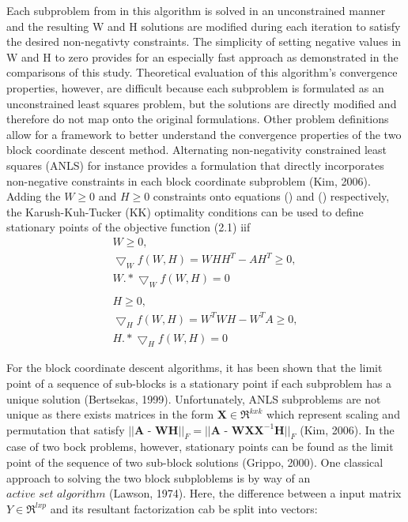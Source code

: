 \documentclass[final,leqno,onefignum,onetabnum]{siamltex1213}
\begin{document}
Each subproblem from in this algorithm is solved in an unconstrained manner and the resulting W and H solutions are modified during each iteration to satisfy the desired non-negativty constraints. The simplicity of setting negative values in W and H to zero provides for an especially fast approach as demonstrated in the comparisons of this study. Theoretical evaluation of this algorithm's convergence properties, however, are difficult because each subproblem is formulated as an unconstrained least squares problem, but the solutions are directly modified and therefore do not map onto the original formulations. Other problem definitions allow for a framework to better understand the convergence properties of the two block coordinate descent method. Alternating non-negativity constrained least squares (ANLS) for instance provides a formulation that directly incorporates non-negative constraints in each block coordinate subproblem (Kim, 2006). Adding the $W \ge 0$ and  $ H \ge 0 $ constraints onto equations () and () respectively, the Karush-Kuh-Tucker (KK) optimality conditions can be used to define stationary points of the objective function (2.1) iif
\begin{equation}\label{EKx}
\begin{align} 
  W \ge 0,\\
  \bigtriangledown_W f(W,H)  = WHH^T - AH^T \ge 0,\\
  W.* \bigtriangledown_Wf(W,H) = 0\\ \\
    H \ge 0,\\ 
  \bigtriangledown_H f(W,H)  = W^T WH - W^T A \ge 0,\\
  H.* \bigtriangledown_Hf(W,H) = 0  
  \end{align}
\end{equation}

For the block coordinate descent algorithms, it has been shown that the limit point of a sequence of sub-blocks is a stationary point if each subproblem has a unique solution (Bertsekas, 1999). Unfortunately, ANLS subproblems are not unique as there exists matrices in the form $ \textbf{X} \in \Re^{kxk} $ which represent scaling and permutation that satisfy $ || \textbf{A - WH} ||_{F} = || \textbf{A - WXX}^{-1} \textbf{H} ||_{F} $ (Kim, 2006).  In the case of two bock problems, however, stationary points can be found as the limit point of the sequence of two sub-block solutions (Grippo, 2000). One classical approach to solving the two block subploblems is by way of an $\textit{active set algorithm}$ (Lawson, 1974). Here, the difference between a input matrix $ Y \in \Re^{lxp}$  and its resultant factorization cab be split into vectors:
\end{document}
